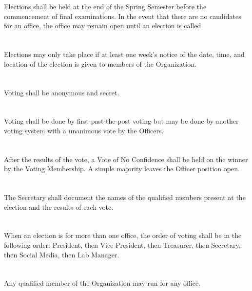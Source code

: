 \documentclass[12pt]{cls/constitution}
\begin{document}
\section{}
Elections shall be held at the end of the Spring Semester before the commencement of final examinations.  In the event that there are no candidates for an office, the office may remain open until an election is called.

\section{}
Elections may only take place if at least one week’s notice of the date, time, and location of the election is given to members of the Organization.

\section{}
Voting shall be anonymous and secret.

\section{}
Voting shall be done by first-past-the-post voting but may be done by another voting system with a unanimous vote by the Officers.

\section{}
After the results of the vote, a Vote of No Confidence shall be held on the winner by the Voting Membership. A simple majority leaves the Officer position open.

\section{}
The Secretary shall document the names of the qualified members present at the election and the results of each vote.

\section{}
When an election is for more than one office, the order of voting shall be in the following order: President, then Vice-President, then Treasurer, then Secretary, then Social Media, then Lab Manager.

\section{}
Any qualified member of the Organization may run for any office.
\end{document}
